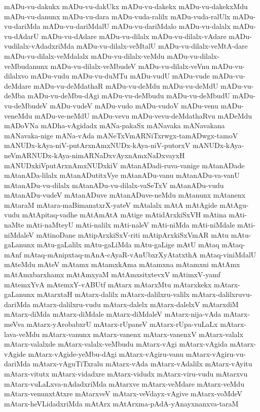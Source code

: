 {mADu-vu-dakukx
mADu-vu-dakUkx
mADu-vu-dakekx
mADu-vu-dakekxMdu
mADu-vu-danunx
mADu-vu-dara
mADu-vuda-ralilx
mADu-vuda-ralUlx
mADu-vu-dariMda
mADu-vu-dariMdalU
mADu-vu-dariMdalo
mADu-vu-dalalx
mADu-vu-dAdarU
mADu-vu-dAdare
mADu-vu-dilalx
mADu-vu-dilalx-vAdare
mADu-vudilalx-vAdadxriMda
mADu-vu-dilalx-veMtalU
mADu-vu-dilalx-veMtA-dare
mADu-vu-dilalx-veMdalalx
mADu-vu-dilalx-veMdu
mADu-vu-dilalx-veMbudanunx
mADu-vu-dilalx-veMbudeV
mADu-vu-dilalx-veVnu
mADu-vu-dilalxvo
mADu-vudu
mADu-vu-duMTu
mADu-vudU
mADu-vude
mADu-vu-deMdare
mADu-vu-deMdathaR
mADu-vu-deMdu
mADu-vu-deMdU
mADu-vu-deMba
mADu-vu-deMbu-dAgi
mADu-vu-deMbudu
mADu-vu-deMbudU
mADu-vu-deMbudeV
mADu-vudeV
mADu-vudo
mADu-vudoV
mADu-venu
mADu-veneMdu
mADu-ve-neMdU
mADu-vevu
mADu-vevu-deMdathaRvu
mADeMdu
mADoVNa
mADha-vAgidadx
mANa-pakaSx
mANavaka
mANavakana
mANavaka-nige
mANa-vAda
mANeTxVmARNiTxrwgx-tamADwgx-tamoV
mANUDx-kAya-niV-putArxnAmxNUDx-kAya-niV-putorxV
mANUDx-kAya-neVmARNUDx-kAya-nimARNaDxvAyxnAmxNaDxvayxH
mANUDxkiVputArxnAmxNUDxkiV
mAtanADadi-ruva-vanige
mAtanADade
mAtanADa-lilalx
mAtanADutitxVye
mAtanADu-vanu
mAtanADu-va-vanU
mAtanADu-vu-dilalx
mAtanADu-vu-dilalx-vaSeTxV
mAtanADu-vudu
mAtanADu-vudeV
mAtanADuve
mAtanADuve-neMdu
mAtanunx
mAtanenx
mAtaraM
mAtara-maBimanatxrX-yateV
mAtalalx
mAtA
mAtAgide
mAtAgu-vudu
mAtApitaq-vadhe
mAtAmAtA
mAtige
mAtidArxkiSxVH
mAtina
mAti-naMte
mAti-naMteyU
mAti-nalilx
mAti-naleV
mAti-niMda
mAti-niMdale
mAti-niMdaleV
mAtinoDane
mAtipArxkiSxV-riti
mAtipArxkiSxVmAR
mAtu
mAtu-gaLanunx
mAtu-gaLalilx
mAtu-gaLiMda
mAtu-gaLige
mAtU
mAtaq
mAtaq-mAnf
mAtaq-mAnipxtaq-mAnA-cAyaR-vAnUbxrXyAtatxthA
mAtaq-viniMdalU
mAteMdu
mAteV
mAtamx
mAtamxkAma
mAtamxna
mAtamxni
mAtAmx
mAtAmxbarxhamx
mAtAmxyaM
mAtAmxsitxtevxV
mAtimxV-yamf
mAtemxYvA
mAtemxY-vABUtf
mAtarx
mAtarxMtu
mAtarxkekx
mAtarx-gaLanunx
mAtarxtaH
mAtarx-dalilx
mAtarx-dalilxru-valilx
mAtarx-dalilxruvu-dariMda
mAtarx-dalilxru-vudu
mAtarx-dalelx
mAtarx-dalelxV
mAtarxdiM
mAtarx-diMda
mAtarx-diMdale
mAtarx-diMdaleV
mAtarx-nija-vAda
mAtarx-meVva
mAtarx-yArobabxrU
mAtarx-rUpaneV
mAtarx-rUpa-vuLaLx
mAtarx-lava-veMdu
mAtarx-vanunx
mAtarx-vanenx
mAtarx-vanenxV
mAtarx-valalx
mAtarx-valalxde
mAtarx-valalx-veMbudu
mAtarx-vAgi
mAtarx-vAgida
mAtarx-vAgide
mAtarx-vAgide-yeMbu-dAgi
mAtarx-vAgiru-vanu
mAtarx-vAgiru-vu-dariMda
mAtarx-vAguTiTxralu
mAtarx-vAda
mAtarx-vAdalilx
mAtarx-vAyitu
mAtarx-vitutx
mAtarx-vidadxre
mAtarx-vidudx
mAtarx-viru-vudu
mAtarxvu
mAtarx-vuLaLxva-nAdadxriMda
mAtarxve
mAtarx-veMdare
mAtarx-veMdu
mAtarx-venunxtAtxre
mAtarxveV
mAtarx-veVdayx-vAgive
mAtarx-voMdeV
mAtarx-heVLidadxriMda
mAtArx
mAtArxma-pAdA-yAnayxnanxva-taraM
}
